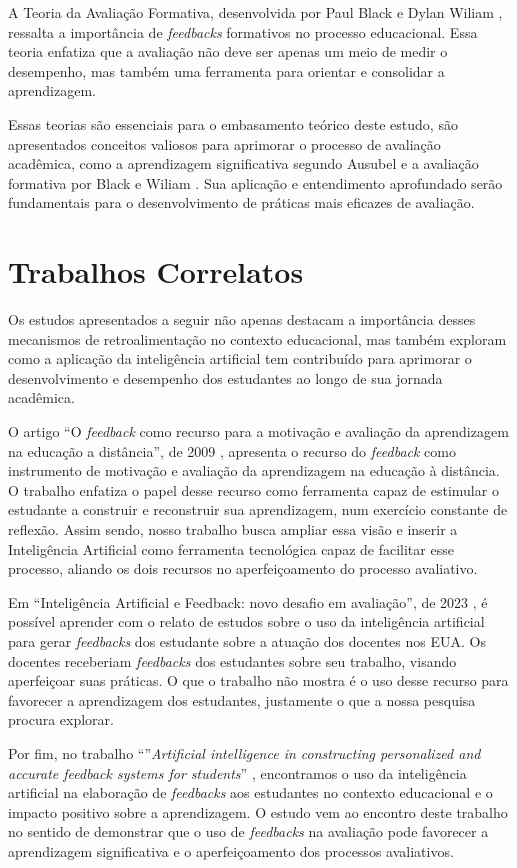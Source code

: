 A Teoria da Avaliação Formativa, desenvolvida por Paul Black e Dylan Wiliam \cite{domingos2006}, ressalta a importância de \textit{feedbacks} formativos no processo educacional. Essa teoria enfatiza que a avaliação não deve ser apenas um meio de medir o desempenho, mas também uma ferramenta para orientar e consolidar a aprendizagem. 

Essas teorias são essenciais para o embasamento teórico deste estudo, são apresentados conceitos valiosos para aprimorar o processo de avaliação acadêmica, como a aprendizagem significativa segundo Ausubel \cite{teorias} e a avaliação formativa por Black e Wiliam \cite{domingos2006}. Sua aplicação e entendimento aprofundado serão fundamentais para o desenvolvimento de práticas mais eficazes de avaliação.

\section{Trabalhos Correlatos}

Os estudos apresentados a seguir não apenas destacam a importância desses mecanismos de retroalimentação no contexto educacional, mas também exploram como a aplicação da inteligência artificial tem contribuído para aprimorar o desenvolvimento e desempenho dos estudantes ao longo de sua jornada acadêmica.

O artigo ``O \textit{feedback} como recurso para a motivação e
avaliação da aprendizagem na educação a
distância'', de 2009 \cite{flores2009}, apresenta o recurso do \textit{feedback} como instrumento de motivação e avaliação da aprendizagem na educação à distância. O trabalho enfatiza o papel desse recurso como ferramenta capaz de estimular o estudante a construir e reconstruir sua aprendizagem, num exercício constante de reflexão. Assim sendo, nosso trabalho busca ampliar essa visão e inserir a Inteligência Artificial como ferramenta tecnológica capaz de facilitar esse processo, aliando os dois recursos no aperfeiçoamento do processo avaliativo.

Em ``Inteligência Artificial e Feedback: novo desafio em avaliação'', de 2023 \cite{villasboas2023}, é possível aprender com o relato de estudos sobre o uso da inteligência artificial para gerar \textit{feedbacks} dos estudante sobre a atuação dos docentes nos EUA. Os docentes receberiam \textit{feedbacks} dos estudantes sobre seu trabalho, visando aperfeiçoar suas práticas. O que o trabalho não mostra é o uso desse recurso para favorecer a aprendizagem dos estudantes, justamente o que a nossa pesquisa procura explorar.



Por fim, no trabalho ``''\textit{Artificial intelligence in constructing personalized and accurate feedback systems for students}'' \cite{xu2023}, encontramos  o uso da inteligência artificial na elaboração de \textit{feedbacks} aos estudantes no contexto educacional e o impacto positivo sobre a aprendizagem. O estudo vem ao encontro deste trabalho no sentido de demonstrar que o uso de \textit{feedbacks} na avaliação pode favorecer a aprendizagem significativa e o aperfeiçoamento dos processos avaliativos.
